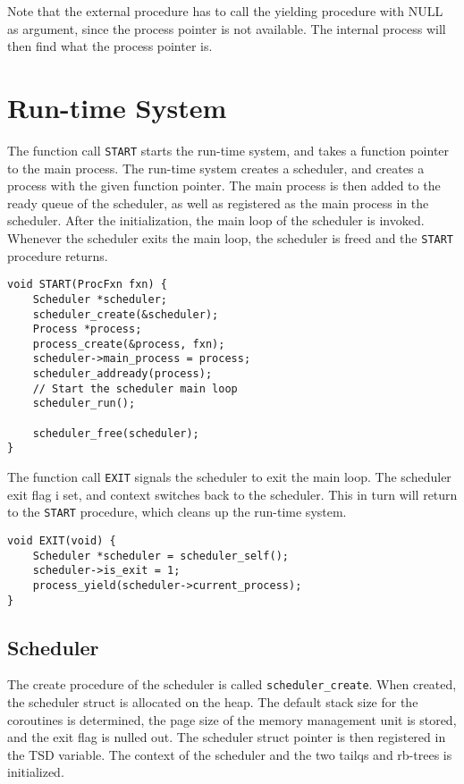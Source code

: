 Note that the external procedure has to call the yielding procedure with NULL as argument, since the process pointer is not available. The internal process will then find what the process pointer is.

\section{Run\hyp{}time System}

The function call \texttt{START} starts the run\hyp{}time system, and takes a function pointer to the main process. The run\hyp{}time system creates a scheduler, and creates a process with the given function pointer. The main process is then added to the ready queue of the scheduler, as well as registered as the main process in the scheduler. After the initialization, the main loop of the scheduler is invoked. Whenever the scheduler exits the main loop, the scheduler is freed and the \texttt{START} procedure returns. 

\begin{lstlisting}[style={CustomC},caption={\texttt{START} procedure}]
void START(ProcFxn fxn) {
    Scheduler *scheduler;
    scheduler_create(&scheduler);
    Process *process;
    process_create(&process, fxn);
    scheduler->main_process = process;
    scheduler_addready(process);
    // Start the scheduler main loop
    scheduler_run();

    scheduler_free(scheduler);
}
\end{lstlisting}

The function call \texttt{EXIT} signals the scheduler to exit the main loop. The scheduler exit flag i set, and context switches back to the scheduler. This in turn will return to the \texttt{START} procedure, which cleans up the run\hyp{}time system. 

\begin{lstlisting}[style={CustomC},caption={\texttt{EXIT} procedure}]
void EXIT(void) {
    Scheduler *scheduler = scheduler_self();
    scheduler->is_exit = 1;
    process_yield(scheduler->current_process);
}
\end{lstlisting}

\subsection{Scheduler}

The create procedure of the scheduler is called \texttt{scheduler\_create}. When created, the scheduler struct is allocated on the heap. The default stack size for the coroutines is determined, the page size of the memory management unit is stored, and the exit flag is nulled out. The scheduler struct pointer is then registered in the TSD variable. The context of the scheduler and the two tailqs and rb\hyp{}trees is initialized.


